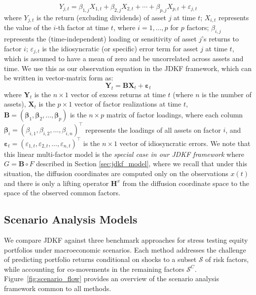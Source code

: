 \documentclass[11pt]{article}
\theoremstyle{plain}
\theoremstyle{definition}
\theoremstyle{remark}
\numberwithin{equation}{section}
\newcommand{\veps}{\varepsilon}
\begin{document}
\[Y_{j,t} = \beta_{1,j} X_{1,t} + \beta_{2,j} X_{2,t} + \cdots + \beta_{p,j} X_{p,t} + \veps_{j,t}\]
\newline
where $Y_{j,t}$ is the return (excluding dividends) of asset $j$ at time $t$; $X_{i,t}$ represents the value of the $i$-th factor at time $t$, where $i = 1, \dots, p$ for $p$ factors; $\beta_{i,j}$ represents the (time-independent) loading or sensitivity of asset $j$'s returns to factor $i$; $\veps_{j,t}$ is the idiosyncratic (or specific) error term for asset $j$ at time $t$, which is assumed to have a mean of zero and be uncorrelated across assets and time. We use this as our observation equation in the JDKF framework, which can be written in vector-matrix form as:
\[
\mathbf{Y}_t = \mathbf{B} \mathbf{X}_t + \mathbf{\veps}_t
\]
where \( \mathbf{Y}_t \) is the \( n \times 1 \) vector of excess returns at time \( t \) (where $n$ is the number of assets), \( \mathbf{X}_t\) is the \( p \times 1 \) vector of factor realizations at time \( t \), \( \mathbf{B} = (\mathbf{\beta}_1, \mathbf{\beta}_2, \dots, \mathbf{\beta}_p) \) is the \( n \times p \) matrix of factor loadings, where each column \( \mathbf{\beta}_i = (\beta_{i,1}, \beta_{i,2}, \dots, \beta_{i,n})^\top \) represents the loadings of all assets on factor \( i \), and \( \mathbf{\veps}_t = (\veps_{1,t}, \veps_{2,t}, \dots, \veps_{n,t})^\top \) is the \( n \times 1 \) vector of idiosyncratic errors. We note that this linear multi-factor model is the \textit{special case in our JDKF framework} where $G=\mathbf{B} \circ F$ described in Section \ref{sec:jdkf_model}, where we recall that under this situation, the diffusion coordinates are computed only on the observations ${x(t)}$ and there is only a lifting operator $\mathbf{H}^x$ from the diffusion coordinate space to the space of the observed common factors.

\subsection{Scenario Analysis Models}
\label{sec:stress_benchmarks}

We compare JDKF against three benchmark approaches for stress testing equity portfolios under macroeconomic scenarios. Each method addresses the challenge of predicting portfolio returns conditional on shocks to a subset $\mathcal{S}$ of risk factors, while accounting for co-movements in the remaining factors $\mathcal{S}^C$. Figure~\ref{fig:scenario_flow} provides an overview of the scenario analysis framework common to all methods.
\end{document}

